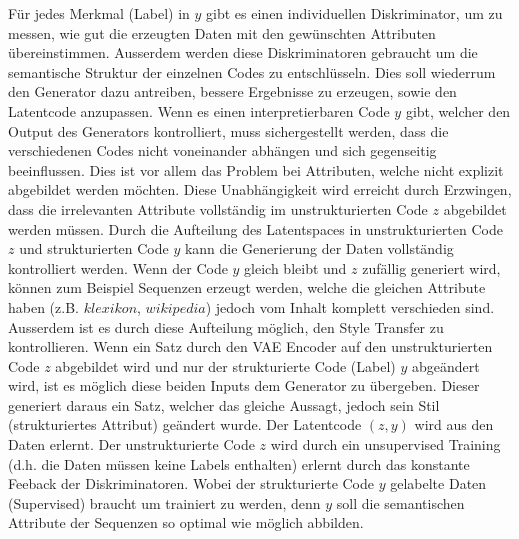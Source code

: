 \noindent
Für jedes Merkmal (Label) in $y$ gibt es einen individuellen Diskriminator, um zu messen, wie gut die erzeugten Daten
mit den gewünschten Attributen übereinstimmen. Ausserdem werden diese Diskriminatoren gebraucht um die semantische
Struktur der einzelnen Codes zu entschlüsseln. Dies soll wiederrum den Generator dazu antreiben, bessere Ergebnisse zu
erzeugen, sowie den Latentcode anzupassen.
\newline
\newline
Wenn es einen interpretierbaren Code $y$ gibt, welcher den Output des Generators kontrolliert, muss sichergestellt
werden, dass die verschiedenen Codes nicht voneinander abhängen und sich gegenseitig beeinflussen. Dies ist vor allem
das Problem bei Attributen, welche nicht explizit abgebildet werden möchten. Diese Unabhängigkeit wird erreicht durch
Erzwingen, dass die irrelevanten Attribute vollständig im unstrukturierten Code $z$ abgebildet werden müssen.
\newline
\newline
Durch die Aufteilung des Latentspaces in unstrukturierten Code $z$ und strukturierten Code $y$ kann die Generierung der
Daten vollständig kontrolliert werden. Wenn der Code $y$ gleich bleibt und $z$ zufällig generiert wird, können zum
Beispiel Sequenzen erzeugt werden, welche die gleichen Attribute haben (z.B. $klexikon$, $wikipedia$) jedoch vom Inhalt
komplett verschieden sind. Ausserdem ist es durch diese Aufteilung möglich, den Style Transfer zu kontrollieren. Wenn
ein Satz durch den \gls{VAE} Encoder auf den unstrukturierten Code $z$ abgebildet wird und nur der strukturierte Code
(Label) $y$ abgeändert wird, ist es möglich diese beiden Inputs dem Generator zu übergeben. Dieser generiert daraus ein
Satz, welcher das gleiche Aussagt, jedoch sein Stil (strukturiertes Attribut) geändert wurde.
\newline
\newline
Der Latentcode $(z, y)$ wird aus den Daten erlernt. Der unstrukturierte Code $z$ wird durch ein unsupervised Training
(d.h. die Daten müssen keine Labels enthalten) erlernt durch das konstante Feeback der Diskriminatoren. Wobei der
strukturierte Code $y$ gelabelte Daten (Supervised) braucht um trainiert zu werden, denn $y$ soll die semantischen
Attribute der Sequenzen so optimal wie möglich abbilden.

